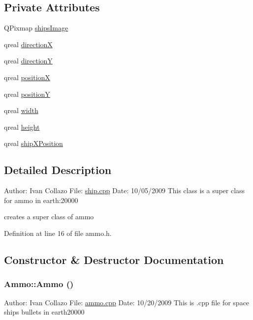 \subsection*{Private Attributes}
\begin{DoxyCompactItemize}
\item 
QPixmap \hyperlink{class_ammo_a605ab79d9b1c76edb5f2d889cbc014f3}{shipsImage}
\item 
qreal \hyperlink{class_ammo_a60392d67523d0cf6d46e14b6b3f1ae05}{directionX}
\item 
qreal \hyperlink{class_ammo_a1156ff1439690bf121841528585aa026}{directionY}
\item 
qreal \hyperlink{class_ammo_a7df8c23c0a3023e013c25e2b3fff5385}{positionX}
\item 
qreal \hyperlink{class_ammo_a71fc5db64ac2f32ca10e22f7a7ff0c88}{positionY}
\item 
qreal \hyperlink{class_ammo_aad7996f9abdcb6ade7e67f7c7f5e5ebe}{width}
\item 
qreal \hyperlink{class_ammo_a7ee07e5c3778fe15aeef8126a5251e3b}{height}
\item 
qreal \hyperlink{class_ammo_a86583f8632ca9604ef0ae839d78fe5ef}{shipXPosition}
\end{DoxyCompactItemize}


\subsection{Detailed Description}
Author: Ivan Collazo File: \hyperlink{ship_8cpp}{ship.cpp} Date: 10/05/2009 This class is a super class for ammo in earth:20000

creates a super class of ammo 

Definition at line 16 of file ammo.h.

\subsection{Constructor \& Destructor Documentation}
\hypertarget{class_ammo_a6745bf955cceda43c50dc15c76157e64}{
\subsubsection[{Ammo}]{\setlength{\rightskip}{0pt plus 5cm}Ammo::Ammo ()}}
\label{class_ammo_a6745bf955cceda43c50dc15c76157e64}
Author: Ivan Collazo File: \hyperlink{ammo_8cpp}{ammo.cpp} Date: 10/20/2009 This is .cpp file for space ships bullets in earth20000

